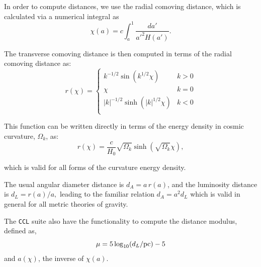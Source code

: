 \documentclass[\docopts]{\docclass}
\newcommand{\ccl}{{\tt CCL}\xspace}
\begin{document}
In order to compute distances, we use the radial comoving distance, which is calculated via a numerical integral as
\begin{equation}
 \chi(a)= c \int_a^1 \frac{da'}{a'^2 H(a')}.
\end{equation}

The transverse comoving distance is then computed in terms of the radial comoving distance as:
\begin{equation}\label{eq:angdist}
 r(\chi)=\left\{\begin{array}{cc}
                 k^{-1/2}\sin(k^{1/2}\chi) & k>0\\
                 \chi & k=0\\
                 |k|^{-1/2}\sinh(|k|^{1/2}\chi) & k<0\\
                \end{array}\right.
\end{equation}

This function can be written directly in terms of the energy density in cosmic curvature, $\Omega_k$, as:
\begin{equation}\label{eq:angdist_omegak}
 r(\chi)=                 \frac{c}{H_0}\sqrt{\Omega_k}\sinh(\sqrt{\Omega_k}\chi),
\end{equation}

which is valid for all forms of the curvature energy density.


The usual angular diameter distance is $d_A=a\,r(a)$, and the luminosity distance is
$d_L=r(a)/a,$ leading to the familiar relation $d_A = a^2d_L$ which is valid in general for all metric theories of gravity.

The \ccl suite also have the functionality to compute the distance modulus, defined as,
\begin{equation}\label{eq:distmod}
    \mu = 5 \log_{10}(d_L / {\rm pc})-5
\end{equation}
and $a(\chi)$, the inverse of $\chi(a)$.

\end{document}

